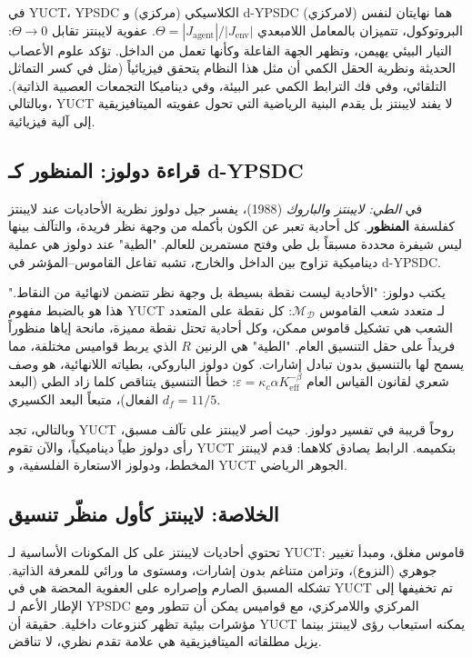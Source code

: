 \documentclass[12pt,a4paper]{article}
\begin{document}
	في YUCT، YPSDC الكلاسيكي (مركزي) و d-YPSDC (لامركزي) هما نهايتان لنفس البروتوكول، تتميزان بالمعامل اللامبعدي \(\Theta = |J_{\mathrm{agent}}|/|J_{\mathrm{env}}|\). عفوية لايبنتز تقابل \(\Theta \to 0\): التيار البيئي يهيمن، وتظهر الجهة الفاعلة وكأنها تعمل من الداخل. تؤكد علوم الأعصاب الحديثة ونظرية الحقل الكمي أن مثل هذا النظام يتحقق فيزيائياً (مثل في كسر التماثل التلقائي، وفي فك الترابط الكمي عبر البيئة، وفي ديناميكا التجمعات العصبية الذاتية). وبالتالي، YUCT لا يفند لايبنتز بل يقدم البنية الرياضية التي تحول عفويته الميتافيزيقية إلى آلية فيزيائية.
	
	\subsection{قراءة دولوز: المنظور كـ d-YPSDC}
	
	في \emph{الطي: لايبنتز والباروك} (1988)، يفسر جيل دولوز نظرية الأحاديات عند لايبنتز كفلسفة \textbf{المنظور}. كل أحادية تعبر عن الكون بأكمله من وجهة نظر فريدة، والتآلف بينها ليس شيفرة محددة مسبقاً بل طي وفتح مستمرين للعالم. "الطية" عند دولوز هي عملية ديناميكية تزاوج بين الداخل والخارج، تشبه تفاعل القاموس–المؤشر في d-YPSDC.
	
	يكتب دولوز: "الأحادية ليست نقطة بسيطة بل وجهة نظر تتضمن لانهائية من النقاط." هذا هو بالضبط مفهوم YUCT لـ متعدد شعب القاموس \(\mathcal{M}_{\mathcal{D}}\): كل نقطة على المتعدد الشعب هي تشكيل قاموس ممكن، وكل أحادية تحتل نقطة مميزة، مانحة إياها منظوراً فريداً على حقل التنسيق العام. "الطية" هي الرنين \(R\) الذي يربط قواميس مختلفة، مما يسمح لها بالتنسيق بدون تبادل إشارات. كون دولوز الباروكي، بطياته اللانهائية، هو وصف شعري لقانون القياس العام \(\varepsilon = \kappa_c \alpha K_{\mathrm{eff}}^{-\beta}\): خطأ التنسيق يتناقص كلما زاد الطي (البعد الفعال)، متبعاً البعد الكسيري \(d_f = 11/5\).
	
	وبالتالي، تجد YUCT روحاً قريبة في تفسير دولوز. حيث أصر لايبنتز على تآلف مسبق، رأى دولوز طياً ديناميكياً، والآن تقوم YUCT بتكميمه. الرابط يصادق كلاهما: قدم لايبنتز المخطط، ودولوز الاستعارة الفلسفية، و YUCT الجوهر الرياضي.
	
	\subsection{الخلاصة: لايبنتز كأول منظّر تنسيق}
	
	تحتوي أحاديات لايبنتز على كل المكونات الأساسية لـ YUCT: قاموس مغلق، ومبدأ تغيير جوهري (النزوع)، وتزامن متناغم بدون إشارات، ومستوى ما ورائي للمعرفة الذاتية. تشكله المسبق الصارم وإصراره على العفوية المحضة هي في YUCT تم تخفيفها إلى الإطار الأعم لـ YPSDC المركزي واللامركزي، مع قواميس يمكن أن تتطور ومع مؤشرات بيئية تظهر كنزوعات داخلية. حقيقة أن YUCT يمكنه استيعاب رؤى لايبنتز بينما يزيل مطلقاته الميتافيزيقية هي علامة تقدم نظري، لا تناقض.
	
\end{document}
